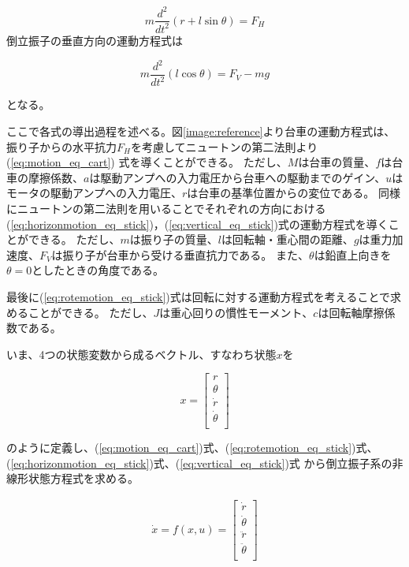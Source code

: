	\begin{equation}
		m\frac{d^{2}}{dt^{2}}(r+l\sin\theta) = F_{H}
		\label{eq:horizonmotion_eq_stick}
	\end{equation}
	倒立振子の垂直方向の運動方程式は
	
	\begin{equation}
		m\frac{d^{2}}{dt^{2}}(l\cos\theta) = F_{V}-mg
		\label{eq:vertical_eq_stick}
	\end{equation}
	
	\noindent
	となる。
	\par
	ここで各式の導出過程を述べる。図\ref{image:reference}より台車の運動方程式は、振り子からの水平抗力$F_{H}$を考慮してニュートンの第二法則より(\ref{eq:motion_eq_cart})
	式を導くことができる。
	ただし、$M$は台車の質量、$f$は台車の摩擦係数、$a$は駆動アンプへの入力電圧から台車への駆動までのゲイン、$u$はモータの駆動アンプへの入力電圧、$r$は台車の基準位置からの変位である。
	同様にニュートンの第二法則を用いることでそれぞれの方向における(\ref{eq:horizonmotion_eq_stick})，(\ref{eq:vertical_eq_stick})式の運動方程式を導くことができる。
	ただし、$m$は振り子の質量、$l$は回転軸・重心間の距離、$g$は重力加速度、$F_{V}$は振り子が台車から受ける垂直抗力である。
	また、$\theta$は鉛直上向きを$\theta=0$としたときの角度である。
	\par
	最後に(\ref{eq:rotemotion_eq_stick})式は回転に対する運動方程式を考えることで求めることができる。
	ただし、$J$は重心回りの慣性モーメント、$c$は回転軸摩擦係数である。
	\par
	いま、4つの状態変数から成るベクトル、すなわち状態$x$を
					
	\[
		x=\left[
		\begin{array}{ccc}
			r\\
			\theta\\
			\dot{r}\\
			\dot{\theta}\\
		\end{array}
		\right]
		\label{eq:array1}
	\]
	
	\noindent		
	のように定義し、(\ref{eq:motion_eq_cart})式、(\ref{eq:rotemotion_eq_stick})式、(\ref{eq:horizonmotion_eq_stick})式、(\ref{eq:vertical_eq_stick})式
	から倒立振子系の非線形状態方程式を求める。
	
	\begin{eqnarray}
		\dot{x} = f(x,u) = \left[
		\begin{array}{ccc}
			\dot{r}\\
			\dot{\theta}\\
			\ddot{r}\\
			\ddot{\theta}\\
		\end{array}
		\right]
		\label{eq:array2}
	\end{eqnarray}
					
